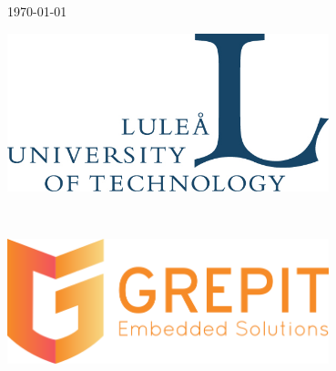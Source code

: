 

\vfill\vfill\vfill %

{\large\today} %


\vfill\vfill
\begin{minipage}{0.35\textwidth}
	\begin{flushleft}
	\includegraphics[width=0.7\textwidth]{Figures/ltu.jpg}\\[1cm] %
	\end{flushleft}
\end{minipage}
~
\begin{minipage}{0.35\textwidth}
	\begin{flushright}
	\includegraphics[width=0.7\textwidth]{Figures/grepit_logo.png}\\[1cm] %
	\end{flushright}
\end{minipage}
 

\vfill %

